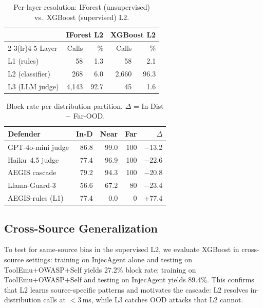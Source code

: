 \documentclass[sigconf,nonacm]{acmart}
\begin{document}
\begin{table}[t]
\centering\small
\caption{Per-layer resolution: IForest (unsupervised) vs.\ XGBoost (supervised) L2.}
\vspace{-0.1in}
\label{tab:perlayer}
\begin{tabular}{lrrrr}
\toprule
 & \multicolumn{2}{c}{IForest L2} & \multicolumn{2}{c}{XGBoost L2} \\
\cmidrule(lr){2-3}\cmidrule(lr){4-5}
Layer & Calls & \% & Calls & \% \\
\midrule
L1 (rules) & 58 & 1.3 & 58 & 2.1 \\
L2 (classifier) & 268 & 6.0 & 2{,}660 & 96.3 \\
L3 (LLM judge) & 4{,}143 & 92.7 & 45 & 1.6 \\
\bottomrule
\end{tabular}
\vspace{-0.1in}
\end{table}

\begin{table}[t]
\centering\small
\caption{Block rate per distribution partition. $\Delta$ = In-Dist $-$ Far-OOD.}
\vspace{-0.1in}
\label{tab:perdist}
\begin{tabular}{lrrrr}
\toprule
Defender & In-D & Near & Far & $\Delta$ \\
\midrule
GPT-4o-mini judge & 86.8 & 99.0 & 100 & $-$13.2 \\
Haiku~4.5 judge & 77.4 & 96.9 & 100 & $-$22.6 \\
AEGIS cascade & 79.2 & 94.3 & 100 & $-$20.8 \\
Llama-Guard-3 & 56.6 & 67.2 & 80 & $-$23.4 \\
AEGIS-rules (L1) & 77.4 & 0.0 & 0 & +77.4 \\
\bottomrule
\end{tabular}
\vspace{-0.1in}
\end{table}

\subsection{Cross-Source Generalization}

To test for same-source bias in the supervised L2, we evaluate XGBoost in cross-source settings: training on InjecAgent alone and testing on ToolEmu+OWASP+Self yields 27.2\% block rate; training on ToolEmu+OWASP+Self and testing on InjecAgent yields 89.4\%. This confirms that L2 learns source-specific patterns and motivates the cascade: L2 resolves in-distribution calls at $<$3\,ms, while L3 catches OOD attacks that L2 cannot.
\end{document}
